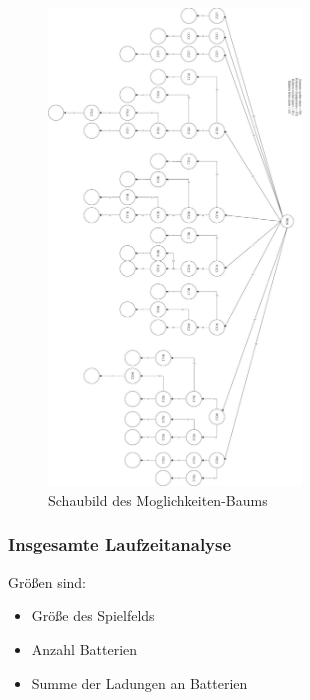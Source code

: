 \documentclass[a4paper,12pt,arial]{scrartcl}
\begin{document}
\begin{figure}[htpb]
    \centering
    \includegraphics[width=0.6\textwidth]{rotated_baum_yeah.jpg}
    \caption{Schaubild des Moglichkeiten-Baums
    }
    \label{fig:moeglichkeiten_baum}
\end{figure}

\newpage

\subsubsection{Insgesamte Laufzeitanalyse}
Größen sind:
\begin{itemize}
    \item Größe des Spielfelds
    \item Anzahl Batterien
    \item Summe der Ladungen an Batterien
\end{itemize}
\end{document}
